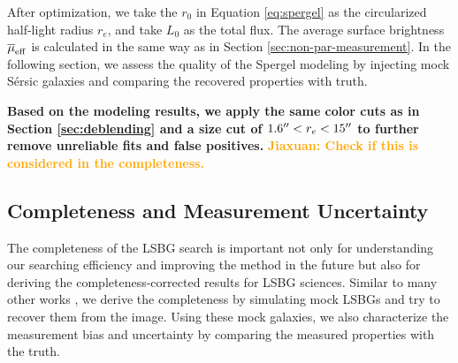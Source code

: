 \documentclass[twocolumn,astrosymb,twocolappendix]{aastex631}
\newcommand{\jiaxuan}[1]{\textcolor{orange}{\textbf{Jiaxuan: #1}}}
\newcommand{\sersic}{S\'ersic}
\begin{document}
\begin{CJK*}{UTF8}{gbsn}
After optimization, we take the $r_0$ in Equation \eqref{eq:spergel} as the circularized half-light radius $r_e$, and take $L_0$ as the total flux. The average surface brightness $\overline{\mu}_{\rm eff}$ is calculated in the same way as in Section \ref{sec:non-par-measurement}. In the following section, we assess the quality of the Spergel modeling by injecting mock \sersic{} galaxies and comparing the recovered properties with truth. 

\textbf{
Based on the modeling results, we apply the same color cuts as in Section \ref{sec:deblending} and a size cut of $1.6\mbox{$^{\prime\prime}$} < r_e < 15\mbox{$^{\prime\prime}$}$ to further remove unreliable fits and false positives. }
\jiaxuan{Check if this is considered in the completeness.}

\subsection{Completeness and Measurement Uncertainty}\label{sec:comp_meas}
The completeness of the LSBG search is important not only for understanding our searching efficiency and improving the method in the future but also for deriving the completeness-corrected results for LSBG sciences. Similar to many other works \citep[e.g.,][]{Zaritsky2021,CarlstenELVES2022,Greene2022}, we derive the completeness by simulating mock LSBGs and try to recover them from the image. Using these mock galaxies, we also characterize the measurement bias and uncertainty by comparing the measured properties with the truth. 



\end{CJK*}
\end{document}
